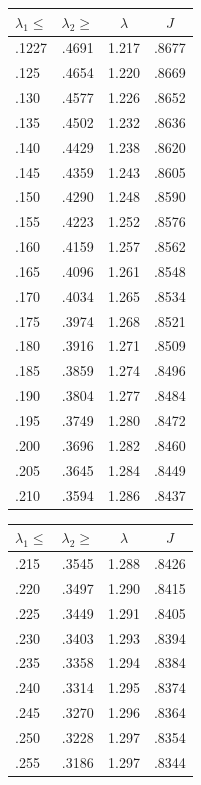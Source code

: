 \documentclass[12pt,psamsfonts]{amsart}
\theoremstyle{definition}
\theoremstyle{remark}
\numberwithin{equation}{section}
\begin{document}
\begin{table}
\begin{tabular}{l|c|c|c} 
 $\lambda_1 \leq$ & $\lambda_2 \geq$ & $\lambda$ & $J$ \\ 
 \hline 
 .1227 &  .4691 &  1.217 &  .8677 \\ 
 .125 &  .4654 &  1.220 &  .8669 \\ 
 .130 &  .4577 &  1.226 &  .8652 \\ 
 .135 &  .4502 &  1.232 &  .8636 \\ 
 .140 &  .4429 &  1.238 &  .8620 \\ 
 .145 &  .4359 &  1.243 &  .8605 \\ 
 .150 &  .4290 &  1.248 &  .8590 \\ 
 .155 &  .4223 &  1.252 &  .8576 \\ 
 .160 &  .4159 &  1.257 &  .8562 \\ 
 .165 &  .4096 &  1.261 &  .8548 \\ 
 .170 &  .4034 &  1.265 &  .8534 \\ 
 .175 &  .3974 &  1.268 &  .8521 \\ 
 .180 &  .3916 &  1.271 &  .8509 \\ 
 .185 &  .3859 &  1.274 &  .8496 \\ 
 .190 &  .3804 &  1.277 &  .8484 \\ 
 .195 &  .3749 &  1.280 &  .8472 \\ 
 .200 &  .3696 &  1.282 &  .8460 \\ 
 .205 &  .3645 &  1.284 &  .8449 \\ 
 .210 &  .3594 &  1.286 &  .8437 \\ 
 \end{tabular}
 \qquad
 \begin{tabular}{l|c|c|c} 
 $\lambda_1 \leq$ & $\lambda_2 \geq$ & $\lambda$ & $J$ \\ 
 \hline 
 .215 &  .3545 &  1.288 &  .8426 \\ 
 .220 &  .3497 &  1.290 &  .8415 \\ 
 .225 &  .3449 &  1.291 &  .8405 \\ 
 .230 &  .3403 &  1.293 &  .8394 \\ 
 .235 &  .3358 &  1.294 &  .8384 \\ 
 .240 &  .3314 &  1.295 &  .8374 \\ 
 .245 &  .3270 &  1.296 &  .8364 \\ 
 .250 &  .3228 &  1.297 &  .8354 \\ 
 .255 &  .3186 &  1.297 &  .8344 \\ 

\end{tabular}
\end{table}
\end{document}
